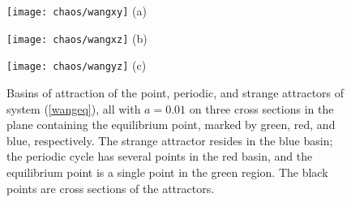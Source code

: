 \begin{figure}
\centering
\begin{minipage}[b]{0.4\linewidth}
\centering
\texttt{[image: chaos/wangxy]}
{\small (a)}
\end{minipage}
\begin{minipage}[b]{0.4\linewidth}
\centering
\texttt{[image: chaos/wangxz]}
{\small (b)}
\end{minipage}
\begin{minipage}[b]{0.4\linewidth}
\centering
\texttt{[image: chaos/wangyz]}
{\small (c)}
\end{minipage}
\caption{\label{f3}Basins of attraction of the point, periodic, and strange attractors of system (\ref{wangeq}), all with $a=0.01$ on three cross sections in the plane containing the equilibrium point, marked by green, red, and blue, respectively. The strange attractor resides in the blue basin; the periodic cycle has several points in the red basin, and the equilibrium point is a single point in the green region. The black points are cross sections of the attractors.}
\end{figure}


%

